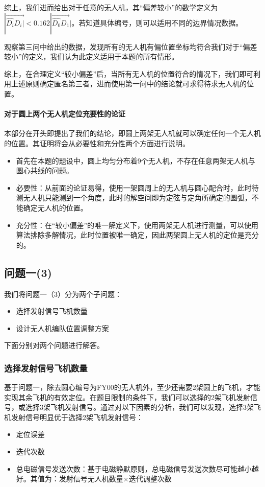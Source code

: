 \documentclass[withoutpreface,bwprint]{cumcmthesis} %
\begin{document}
			综上，我们进而给出对于任意的无人机，其“偏差较小”的数学定义为$|\overrightarrow{\widehat{D_i}D_i|}<0.162|\overrightarrow{\widehat{D_0}D_1}|$。若知道具体编号，则可以适用不同的边界情况数据。
			
			观察第三问中给出的数据，发现所有的无人机有偏位置坐标均符合我们对于“偏差较小”的定义，我们认为此定义适用于本题的所有情形。
			
			综上，在合理定义“较小偏差”后，当所有无人机的位置符合的情况下，我们即可利用上述原则确定匿名第三者，进而使用第一问中的结论就可求得待求无人机的位置。
			
			\paragraph{对于圆上两个无人机定位充要性的论证}
			本部分在开头即提出了我们的结论，即圆上两架无人机就可以确定任何一个无人机的位置。其证明将会从必要性和充分性两个方面进行说明。
			\begin{itemize}
				\item	首先在本题的题设中，圆上均匀分布着9个无人机，不存在任意两架无人机与圆心共线的问题。
				\item	必要性：从前面的论证易得，使用一架圆周上的无人机与圆心配合时，此时待测无人机只能测到一个角度，此时的解空间即为定弦与定角所确定的圆弧，不能确定无人机的位置。
				\item	充分性：在“较小偏差”的唯一解定义下，使用两架无人机进行测量，可以使用算法排除多解情况，此时位置被唯一确定，因此两架圆上无人机的定位是充分的。
			\end{itemize}
			
		\subsection{问题一(3)}
			\par 我们将问题一（3）分为两个子问题：
			\begin{itemize}
				\item 选择发射信号飞机数量
				\item 设计无人机编队位置调整方案
			\end{itemize}
			下面分别对两个问题进行解答。
			\subsubsection{选择发射信号飞机数量}
			基于问题一，除去圆心编号为FY00的无人机外，至少还需要2架圆上的飞机，才能实现其余飞机的有效定位。在题目限制的条件下，我们可以选择的2架飞机发射信号，或选择3架飞机发射信号。通过对以下因素的分析，我们可以发现，选择3架飞机发射信号明显优于选择2架飞机发射信号：
			\begin{itemize}
				\item 定位误差
				\item 迭代次数
				\item 总电磁信号发送次数：基于电磁静默原则，总电磁信号发送次数尽可能越小越好。其值为：发射信号无人机数量$\times$迭代调整次数
			\end{itemize}
\end{document}
